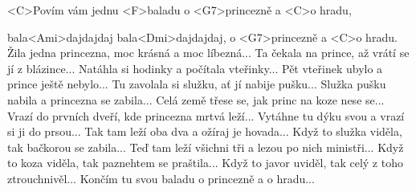 
\zs
<C>Povím vám jednu <F>baladu o <G7>princezně a <C>o hradu,

bala<Ami>dajdajdaj bala<Dmi>dajdajdaj, o <G7>princezně a <C>o hradu.
\ks
\zs
Žila jedna princezna, moc krásná a moc líbezná...
\ks
\zs
Ta čekala na prince, až vrátí se jí z blázince...
\ks
\zs
Natáhla si hodinky a počítala vteřinky...
\ks
\zs
Pět vteřinek ubylo a prince ještě nebylo...
\ks
\zs
Tu zavolala si služku, ať jí nabije pušku...
\ks
\zs
Služka pušku nabila a princezna se zabila...
\ks
\zs
Celá země třese se, jak princ na koze nese se...
\ks
\zs
Vrazí do prvních dveří, kde princezna mrtvá leží...
\ks
\zs
Vytáhne tu dýku svou a vrazí si ji do prsou...
\ks
\zs
Tak tam leží oba dva a ožíraj je hovada...
\ks
\zs
Když to služka viděla, tak bačkorou se zabila...
\ks
\zs
Teď tam leží všichni tři a lezou po nich ministři...
\ks
\zs
Když to koza viděla, tak paznehtem se praštila...
\ks
\zs
Když to javor uviděl, tak celý z toho ztrouchnivěl...
\ks
\zs
Končím tu svou baladu o princezně a o hradu...
\ks

\kp
